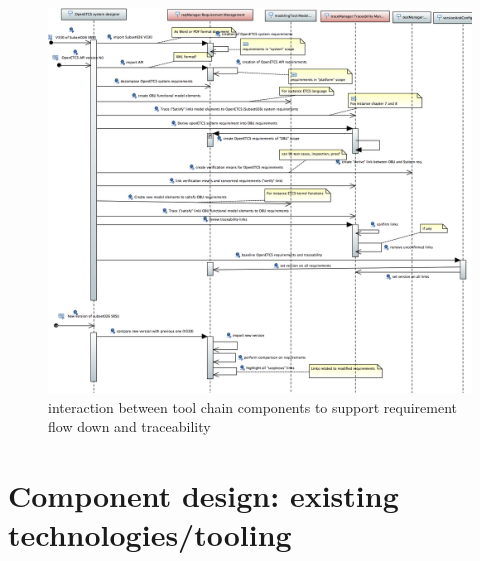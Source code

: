 \documentclass[11pt]{template/openetcs_report}
\begin{document}
\begin{figure}[hbtp]
\centering
\includegraphics[width=1.1\linewidth]{images/ToolChainWhiteBoxInteractionsConcerningTraceability.png}
\caption{\label{fig:ToolChainWhiteBoxInteractionsConcerningTraceability}interaction between tool chain components to support requirement flow down and traceability}
\end{figure}

\section{Component design: existing technologies/tooling}
\end{document}

